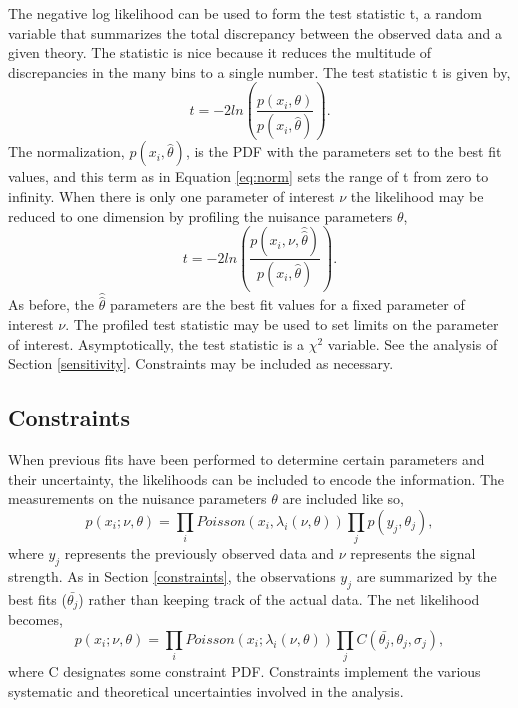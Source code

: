 \documentclass[12pt]{article}
\begin{document}
The negative log likelihood can be used to form the test statistic t, a random variable that summarizes the total discrepancy between the observed data and a given theory. The statistic is nice because it reduces the multitude of discrepancies in the many bins to a single number. The test statistic t is given by, 
\begin{equation}
t = -2ln\left(\frac{p(x_i,\theta)}{p(x_i,\hat{\theta})}\right).
\end{equation}
The normalization, $p(x_i,\hat{\theta})$, is the PDF with the parameters set to the best fit values, and this term as in Equation \ref{eq:norm} sets the range of t from zero to infinity. When there is only one parameter of interest $\nu$ the likelihood may be reduced to one dimension by profiling the nuisance parameters $\theta$,
\begin{equation}
t = -2ln\left(\frac{p(x_i,\nu,\hat{\hat{\theta}})}{p(x_i,\hat{\theta})}\right).
\end{equation}
As before, the $\hat{\hat{\theta}}$ parameters are the best fit values for a fixed parameter of interest $\nu$. The profiled test statistic may be used to set limits on the parameter of interest. Asymptotically, the test statistic is a $\chi^2$ variable. See the analysis of Section \ref{sensitivity}. Constraints may be included as necessary. 

\subsection{Constraints}

When previous fits have been performed to determine certain parameters and their uncertainty, the likelihoods can be included to encode the information. The measurements on the nuisance parameters $\theta$ are included like so,
\begin{equation}
p(x_i; \nu, \theta) = \prod_i Poisson(x_i, \lambda_i(\nu, \theta))\prod_j p(y_j, \theta_j),
\end{equation}
where $y_j$ represents the previously observed data and $\nu$ represents the signal strength. As in Section \ref{constraints}, the observations $y_j$ are summarized by the best fits ($\bar{\theta_j}$) rather than keeping track of the actual data. The net likelihood becomes,
\begin{equation}
p(x_i; \nu, \theta) = \prod_i Poisson(x_i; \lambda_i(\nu, \theta))\prod_j C(\bar{\theta_j}, \theta_j, \sigma_j),
\end{equation}
where C designates some constraint PDF. Constraints implement the various systematic and theoretical uncertainties involved in the analysis.  
\end{document}
